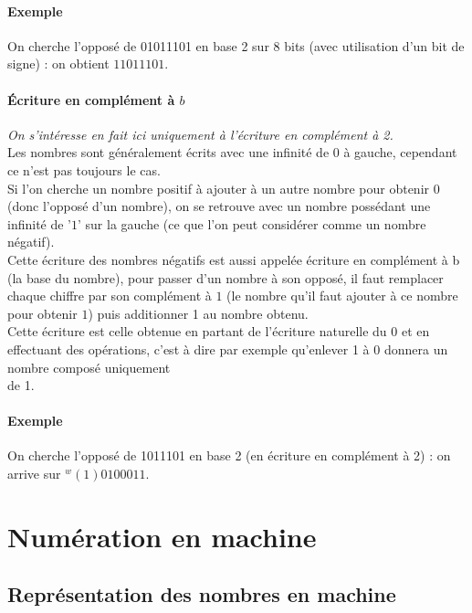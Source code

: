 \documentclass[a4paper,10pt]{book}
\begin{document}
\subsubsection{Exemple}
On cherche l'opposé de 01011101 en base 2 sur 8 bits (avec utilisation d'un bit de signe) : on obtient $11011101$.

\subsubsection{Écriture en complément à $b$}
\emph{On s’intéresse en fait ici uniquement à l'écriture en complément à 2.}\\

Les nombres sont généralement écrits avec une infinité de 0 à gauche, cependant ce n'est pas toujours le cas.\\

Si l'on cherche un nombre positif à ajouter à un autre nombre pour obtenir 0 (donc l'opposé d'un nombre), on se retrouve avec un nombre possédant une infinité de '$1$' sur la gauche (ce que l'on peut considérer comme un nombre négatif).\\

Cette écriture des nombres négatifs est aussi appelée écriture en complément à b (la base du nombre), pour passer d'un nombre à son opposé, il faut remplacer chaque chiffre par son complément à $1$ (le nombre qu'il faut ajouter à ce nombre pour obtenir $1$) puis additionner 1 au nombre obtenu.\\

Cette écriture est celle obtenue en partant de l'écriture naturelle du $0$ et en effectuant des opérations, c'est à dire par exemple qu'enlever 1 à 0 donnera un nombre composé uniquement\\
de 1.

\subsubsection{Exemple}
On cherche l'opposé de 1011101 en base 2 (en écriture en complément à 2) : on arrive sur ${}^{w}(1)0100011$.

\chapter{Numération en machine}
\section{Représentation des nombres en machine}
\end{document}
